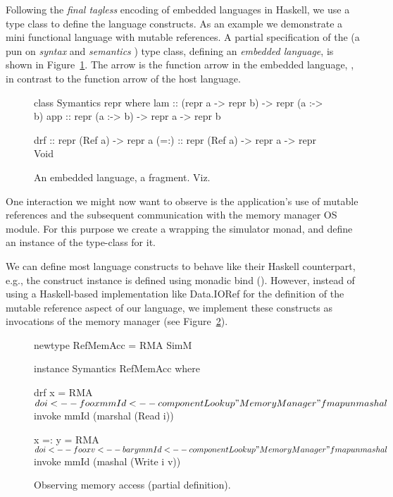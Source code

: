 Following the \emph{final tagless} \cite{final_tagless_embedding} encoding of embedded languages in Haskell, we use a type class to define the language constructs.
As an example we demonstrate a mini functional language with mutable references.
A partial specification of the  (a pun on \emph{syntax} and \emph{semantics} \cite{final_tagless_embedding}) type class, defining an \emph{embedded language}, is shown in Figure~\ref{fig:embedded_language_interface}.
The arrow \hs{:->} is the function arrow in the embedded language, \eg {}, in contrast to the function arrow \hs{->} of the host language.

\begin{figure}
\centering
\begin{code}
class Symantics repr where
  lam   :: (repr a -> repr b) -> repr (a :-> b)
  app   :: repr (a :-> b) -> repr a -> repr b

  drf   :: repr (Ref a) -> repr a
  (=:)  :: repr (Ref a) -> repr a -> repr Void
\end{code}
\caption{An embedded language, a fragment. Viz.~\cite{final_tagless_embedding}}
\label{fig:embedded_language_interface}
\end{figure}

One interaction we might now want to observe is the application's use of mutable references and the subsequent communication with the memory manager OS module.
For this purpose we create a  wrapping the simulator monad, and define an instance of the  type-class for it.

We can define most language constructs to behave like their Haskell counterpart, e.g., the  construct instance is defined using monadic bind (\hs{>>=}\xspace).
However, instead of using a Haskell-based implementation like \textsf{Data.IORef} for the definition of the mutable reference aspect of our language, we implement these constructs as invocations of the memory manager (see Figure~\ref{lst_observing_memory_access}).

\begin{figure}
\centering
\begin{code}
newtype RefMemAcc =  RMA SimM

instance Symantics RefMemAcc where

  drf x = RMA $ do
    i     <-- foo x
    mmId  <-- componentLookup "MemoryManager"
    fmap unmashal $ invoke mmId (marshal (Read i))

  x =: y = RMA $ do
    i     <-- foo x
    v     <-- bar y
    mmId  <-- componentLookup "MemoryManager"
    fmap unmashal $ invoke mmId (mashal (Write i v))
\end{code}
\caption{Observing memory access (partial definition).}
\label{lst_observing_memory_access}
\end{figure}


